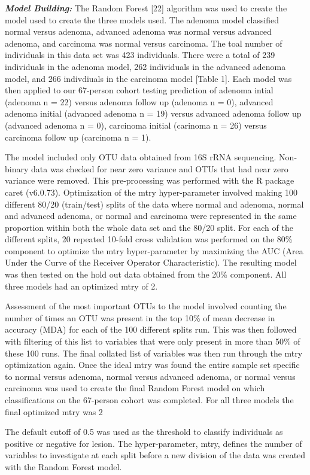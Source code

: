 \documentclass[12pt,]{article}
\begin{document}
\textbf{\emph{Model Building:}} The Random Forest {[}22{]} algorithm was
used to create the model used to create the three models used. The
adenoma model classified normal versus adenoma, advanced adenoma was
normal versus advanced adenoma, and carcinoma was normal versus
carcinoma. The toal number of individuals in this data set was 423
individuals. There were a total of 239 individuals in the adenoma model,
262 individuals in the advanced adenoma model, and 266 indivdiuals in
the carcinoma model {[}Table 1{]}. Each model was then applied to our
67-person cohort testing prediction of adenoma intial (adenoma n = 22)
versus adenoma follow up (adenoma n = 0), advanced adenoma initial
(advanced adenoma n = 19) versus advanced adenoma follow up (advanced
adenoma n = 0), carcinoma initial (carinoma n = 26) versus carcinoma
follow up (carcinoma n = 1).

The model included only OTU data obtained from 16S rRNA sequencing.
Non-binary data was checked for near zero variance and OTUs that had
near zero variance were removed. This pre-processing was performed with
the R package caret (v6.0.73). Optimization of the mtry hyper-parameter
involved making 100 different 80/20 (train/test) splits of the data
where normal and adenoma, normal and advanced adenoma, or normal and
carcinoma were represented in the same proportion within both the whole
data set and the 80/20 split. For each of the different splits, 20
repeated 10-fold cross validation was performed on the 80\% component to
optimize the mtry hyper-parameter by maximizing the AUC (Area Under the
Curve of the Receiver Operator Characteristic). The resulting model was
then tested on the hold out data obtained from the 20\% component. All
three models had an optimized mtry of 2.

Assessment of the most important OTUs to the model involved counting the
number of times an OTU was present in the top 10\% of mean decrease in
accuracy (MDA) for each of the 100 different splits run. This was then
followed with filtering of this list to variables that were only present
in more than 50\% of these 100 runs. The final collated list of
variables was then run through the mtry optimization again. Once the
ideal mtry was found the entire sample set specific to normal versus
adenoma, normal versus advanced adenoma, or normal versus carcinoma was
used to create the final Random Forest model on which classifications on
the 67-person cohort was completed. For all three models the final
optimized mtry was 2

The default cutoff of 0.5 was used as the threshold to classify
individuals as positive or negative for lesion. The hyper-parameter,
mtry, defines the number of variables to investigate at each split
before a new division of the data was created with the Random Forest
model.
\end{document}
